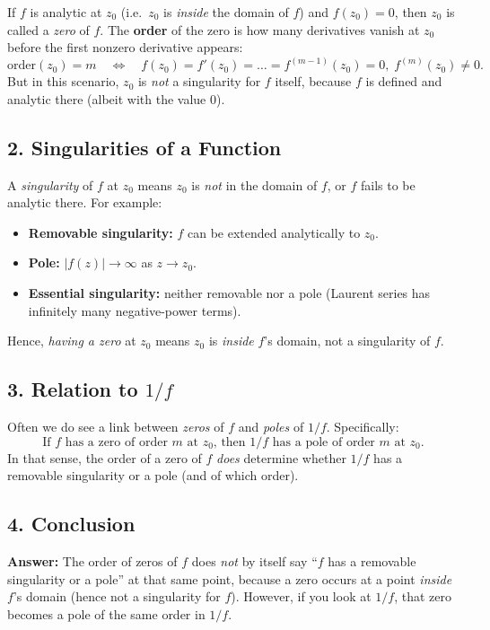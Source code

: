\documentclass[12pt]{article}
\theoremstyle{definition} %
\theoremstyle{plain} %
\begin{document}
If $f$ is analytic at $z_0$ (i.e.\ $z_0$ is \emph{inside} the domain of $f$) and $f(z_0)=0$, then $z_0$ is called a \emph{zero} of $f$. The \textbf{order} of the zero is how many derivatives vanish at $z_0$ before the first nonzero derivative appears:
\[
\text{order}(z_0) = m
\quad\Longleftrightarrow\quad
f(z_0)=f'(z_0)=\dots=f^{(m-1)}(z_0)=0,\;f^{(m)}(z_0)\neq 0.
\]
But in this scenario, $z_0$ is \emph{not} a singularity for $f$ itself, because $f$ is defined and analytic there (albeit with the value $0$).  

\subsection*{2. Singularities of a Function}

A \emph{singularity} of $f$ at $z_0$ means $z_0$ is \emph{not} in the domain of $f$, or $f$ fails to be analytic there. For example:
\begin{itemize}
  \item \textbf{Removable singularity:} $f$ can be extended analytically to $z_0$.  
  \item \textbf{Pole:} $|f(z)|\to\infty$ as $z\to z_0$.  
  \item \textbf{Essential singularity:} neither removable nor a pole (Laurent series has infinitely many negative-power terms).
\end{itemize}

Hence, \emph{having a zero} at $z_0$ means $z_0$ is \emph{inside} $f$'s domain, not a singularity of $f$.

\subsection*{3. Relation to $1/f$}

Often we do see a link between \emph{zeros} of $f$ and \emph{poles} of $1/f$. Specifically:
\[
\text{If $f$ has a zero of order $m$ at $z_0$, then $1/f$ has a pole of order $m$ at $z_0$.}
\]
In that sense, the order of a zero of $f$ \emph{does} determine whether $1/f$ has a removable singularity or a pole (and of which order).

\subsection*{4. Conclusion}

\textbf{Answer:} 
The order of zeros of $f$ does \emph{not} by itself say “$f$ has a removable singularity or a pole” at that same point, because a zero occurs at a point \emph{inside} $f$'s domain (hence not a singularity for $f$). However, if you look at $1/f$, that zero becomes a pole of the same order in $1/f$. 
\end{document}
